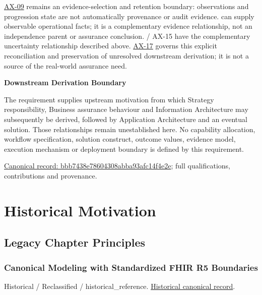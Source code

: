 \hyperref[element:9a5cb9e8876844e58e660f909f7df9fc]{AX-09} remains an evidence-selection and retention boundary: observations and progression state are not automatically provenance or audit evidence. \hyperref[element:eaabcdb96aad4f32a050c94f9ecec049]{\texttt{}} can supply observable operational facts; it is a complementary evidence relationship, not an independence parent or assurance conclusion. \texttt{} / AX-15 have the complementary uncertainty relationship described above. \hyperref[element:8882573df7ce43c6bc0f66da0a676139]{AX-17} governs this explicit reconciliation and preservation of unresolved downstream derivation; it is not a source of the real-world assurance need.



\par\medskip\textbf{Downstream Derivation Boundary}\par


The requirement supplies upstream motivation from which Strategy responsibility, Business assurance behaviour and Information Architecture may subsequently be derived, followed by Application Architecture and an eventual solution. Those relationships remain unestablished here. No capability allocation, workflow specification, solution construct, outcome values, evidence model, execution mechanism or deployment boundary is defined by this requirement.


{\footnotesize \href{../../../../continuum/motivation/requirement/bbb7438e78604308abba93afc14f4e2e.md}{Canonical record: bbb7438e78604308abba93afc14f4e2e}; full qualifications, contributions and provenance.}\par
\chapter{Historical Motivation}

\section{Legacy Chapter Principles}

\subsection{Canonical Modeling with Standardized FHIR R5 Boundaries}

\par\label{element:5d97974406c546078b1d64e5ff85bb13}
Historical / Reclassified / historical\_reference. \href{../../../../continuum/motivation/principle/5d97974406c546078b1d64e5ff85bb13.md}{Historical canonical record}.\par

